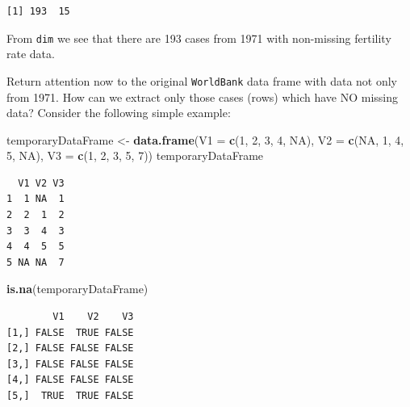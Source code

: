 \documentclass[
]{krantz}
\makeatletter
\newenvironment{Shaded}{\begin{snugshade}}{\end{snugshade}}
\newcommand{\DataTypeTok}[1]{\textcolor[rgb]{0.27,0.27,0.27}{#1}}
\newcommand{\DecValTok}[1]{\textcolor[rgb]{0.06,0.06,0.06}{#1}}
\newcommand{\KeywordTok}[1]{\textcolor[rgb]{0.27,0.27,0.27}{\textbf{#1}}}
\newcommand{\NormalTok}[1]{#1}
\newcommand{\OperatorTok}[1]{\textcolor[rgb]{0.43,0.43,0.43}{\textbf{#1}}}
\newcommand{\OtherTok}[1]{\textcolor[rgb]{0.37,0.37,0.37}{#1}}
\newcommand{\StringTok}[1]{\textcolor[rgb]{0.5,0.5,0.5}{#1}}
\newenvironment{kframe}{%
\medskip{}
\setlength{\fboxsep}{.8em}
 \def\at@end@of@kframe{}%
 \ifinner\ifhmode%
  \def\at@end@of@kframe{\end{minipage}}%
  \begin{minipage}{\columnwidth}%
 \fi\fi%
 \def\FrameCommand##1{\hskip\@totalleftmargin \hskip-\fboxsep
 \colorbox{shadecolor}{##1}\hskip-\fboxsep
     \hskip-\linewidth \hskip-\@totalleftmargin \hskip\columnwidth}%
 \MakeFramed {\advance\hsize-\width
   \@totalleftmargin\z@ \linewidth\hsize
   \@setminipage}}%
 {\par\unskip\endMakeFramed%
 \at@end@of@kframe}
\renewenvironment{Shaded}{\begin{kframe}}{\end{kframe}}
\makeatother
\begin{document}
\begin{Shaded}
\end{Shaded}

\begin{verbatim}
[1] 193  15
\end{verbatim}

From \texttt{dim} we see that there are 193 cases from 1971 with non-missing fertility rate data.

Return attention now to the original \texttt{WorldBank} data frame with data not only from 1971. How can we extract only those cases (rows) which have NO missing data? Consider the following simple example:

\begin{Shaded}
\begin{Highlighting}[]
\NormalTok{temporaryDataFrame \textless{}{-}}\StringTok{ }\KeywordTok{data.frame}\NormalTok{(}\DataTypeTok{V1 =} \KeywordTok{c}\NormalTok{(}\DecValTok{1}\NormalTok{, }\DecValTok{2}\NormalTok{, }\DecValTok{3}\NormalTok{, }\DecValTok{4}\NormalTok{, }\OtherTok{NA}\NormalTok{),}
                                 \DataTypeTok{V2 =} \KeywordTok{c}\NormalTok{(}\OtherTok{NA}\NormalTok{, }\DecValTok{1}\NormalTok{, }\DecValTok{4}\NormalTok{, }\DecValTok{5}\NormalTok{, }\OtherTok{NA}\NormalTok{),}
                                 \DataTypeTok{V3 =} \KeywordTok{c}\NormalTok{(}\DecValTok{1}\NormalTok{, }\DecValTok{2}\NormalTok{, }\DecValTok{3}\NormalTok{, }\DecValTok{5}\NormalTok{, }\DecValTok{7}\NormalTok{))}
\NormalTok{temporaryDataFrame}
\end{Highlighting}
\end{Shaded}

\begin{verbatim}
  V1 V2 V3
1  1 NA  1
2  2  1  2
3  3  4  3
4  4  5  5
5 NA NA  7
\end{verbatim}

\begin{Shaded}
\begin{Highlighting}[]
\KeywordTok{is.na}\NormalTok{(temporaryDataFrame)}
\end{Highlighting}
\end{Shaded}

\begin{verbatim}
        V1    V2    V3
[1,] FALSE  TRUE FALSE
[2,] FALSE FALSE FALSE
[3,] FALSE FALSE FALSE
[4,] FALSE FALSE FALSE
[5,]  TRUE  TRUE FALSE
\end{verbatim}
\end{document}
